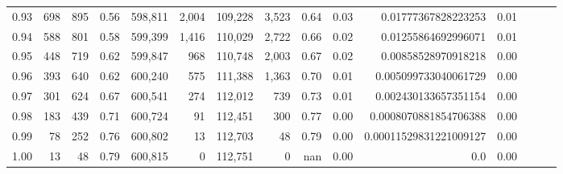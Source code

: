 \begin{tabular}{rrrrrrrrrrrrrrr}
0.93 &     698 &    895 &  0.56 &  598,811 &    2,004 &  109,228 &    3,523 &  0.64 &  0.03 &     0.01777367828223253 &      0.01 \\
0.94 &     588 &    801 &  0.58 &  599,399 &    1,416 &  110,029 &    2,722 &  0.66 &  0.02 &     0.01255864692996071 &      0.01 \\
0.95 &     448 &    719 &  0.62 &  599,847 &      968 &  110,748 &    2,003 &  0.67 &  0.02 &     0.00858528970918218 &      0.00 \\
0.96 &     393 &    640 &  0.62 &  600,240 &      575 &  111,388 &    1,363 &  0.70 &  0.01 &    0.005099733040061729 &      0.00 \\
0.97 &     301 &    624 &  0.67 &  600,541 &      274 &  112,012 &      739 &  0.73 &  0.01 &    0.002430133657351154 &      0.00 \\
0.98 &     183 &    439 &  0.71 &  600,724 &       91 &  112,451 &      300 &  0.77 &  0.00 &   0.0008070881854706388 &      0.00 \\
0.99 &      78 &    252 &  0.76 &  600,802 &       13 &  112,703 &       48 &  0.79 &  0.00 &  0.00011529831221009127 &      0.00 \\
1.00 &      13 &     48 &  0.79 &  600,815 &        0 &  112,751 &        0 &   nan &  0.00 &                     0.0 &      0.00 \\
\bottomrule
\end{tabular}
